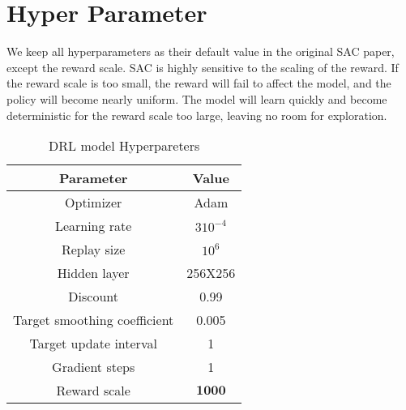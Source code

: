 \section {Hyper Parameter}
We keep all hyperparameters as their default value in the original SAC paper\cite{haarnoja2018soft}, except the reward scale.
SAC is highly sensitive to the scaling of the reward. If the reward scale is too small, the reward will fail to affect the model, and the policy will become nearly uniform. The model will learn quickly and become deterministic for the reward scale too large, leaving no room for exploration.
\par
\begin{table}[ht]
    \centering
    \begin{tabular}{| c|c | }
   \hline \hline
   Parameter & Value \\ \hline \hline
   Optimizer & Adam \\ \hline
   Learning rate & \(3 10^{-4}\) \\ \hline
   Replay size & \(10^6\) \\ \hline
   Hidden layer&   256X256  \\ \hline
   Discount & 0.99 \\ \hline
   Target smoothing coefficient & 0.005 \\ \hline
   Target update interval & 1 \\ \hline
   Gradient steps & 1 \\ \hline
   Reward scale & \(\mathbf{1000}\) \\ \hline
   \hline\hline
    \end{tabular}
    \caption{DRL model Hyperpareters}
    \label{tab:hyperpareters}
\end{table} 
